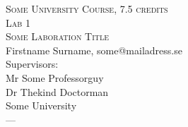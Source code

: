 \documentclass[12pt,a4paper]{article}
\renewcommand{\dateseparator}{--}
\newcommand{\todayiso}{\the\year \dateseparator \twodigit\month \dateseparator \twodigit\day}
\begin{document}
\begin{titlepage}
  \begin{center}
    \LARGE{\textsc{Some University Course, 7.5 credits}}\\ 
    \large{\textsc{Lab 1}}\\
    \large{\textsc{Some Laboration Title}}\\[1cm]
%     
    Firstname Surname, some@mailadress.se\\
    \vfill
    \small{
      Supervisors: \\
      Mr Some Professorguy\\  
      Dr Thekind Doctorman\\  
      \vfill
      Some University \\
      \todayiso
    }
  \end{center}
\end{titlepage}
\end{document}
